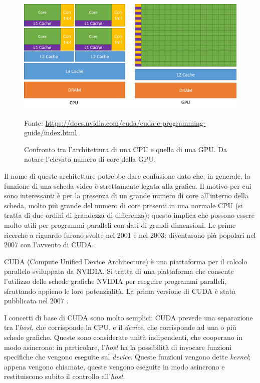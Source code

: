 \documentclass[12pt,a4paper,openright,twoside]{report}
\newcommand{\source}[1]{\caption*{\hfill \scriptsize Fonte: {#1}} }
\begin{document}
\begin{figure}[h]
    \centering
    \includegraphics[width=\textwidth]{cpu-gpu-comparison.png}
    \source{\url{https://docs.nvidia.com/cuda/cuda-c-programming-guide/index.html}}
    \caption[Confronto tra CPU e GPU]{Confronto tra l'architettura di una CPU e quella di una GPU. Da notare l'elevato numero di core della GPU.}
    \label{img:cpu-gpu-comparison}
\end{figure}

Il nome di queste architetture potrebbe dare confusione dato che, in generale, la funzione di una scheda video è strettamente legata alla grafica. Il motivo per cui sono interessanti è per la presenza di un grande numero di core all'interno della scheda, molto più grande del numero di core presenti in una normale CPU (si tratta di due ordini di grandezza di differenza); questo implica che possono essere molto utili per programmi paralleli con dati di grandi dimensioni. Le prime ricerche a riguardo furono svolte nel 2001 e nel 2003; diventarono più popolari nel 2007 con l'avvento di CUDA.

CUDA (Compute Unified Device Architecture) è una piattaforma per il calcolo parallelo sviluppata da NVIDIA. Si tratta di una piattaforma che consente l'utilizzo delle schede grafiche NVIDIA per eseguire programmi paralleli, sfruttando appieno le loro potenzialità. La prima versione di CUDA è stata pubblicata nel 2007 \cite{CUDA}.

I concetti di base di CUDA sono molto semplici: CUDA prevede una separazione tra l'\textit{host}, che corrisponde la CPU, e il \textit{device}, che corrisponde ad una o più schede grafiche. Queste sono considerate unità indipendenti, che cooperano in modo asincrono: in particolare, l'\textit{host} ha la possibilità di invocare funzioni specifiche che vengono eseguite sul \textit{device}. Queste funzioni vengono dette \textit{kernel}; appena vengono chiamate, queste vengono eseguite in modo asincrono e restituiscono subito il controllo all'\textit{host}.
\end{document}
